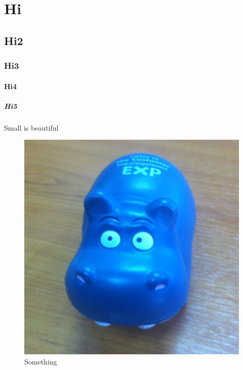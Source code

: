 \documentclass{article}
\begin{document}
	\tableofcontents
	
	\section{Hi}
	\subsection{Hi2}
	\subsubsection{Hi3}
	\paragraph{Hi4}
	\subparagraph{Hi5}	
	Small is beautiful
	\lipsum[1]
	\begin{figure}[htbp]
        \hspace{-1.5cm}
        \includegraphics[width=\textwidth + 3cm]{image}
        \caption{Something}
    \end{figure}
    
    \newpage
    
    \lipsum[1]
\end{document}
